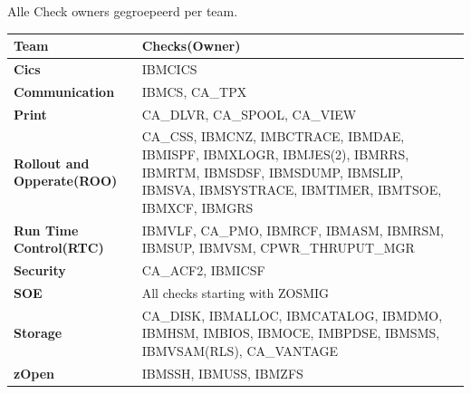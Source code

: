 Alle Check owners gegroepeerd per team.

\begin{table}[h]
	\begin{tabular}{|l|p{9cm}|}
		\hline
		\textbf{Team}                      & \textbf{Checks(Owner)}                                                                                                                                                 \\ \hline
		\textbf{Cics}                      & IBMCICS                                                                                                                                                                \\ \hline
		\textbf{Communication}             & IBMCS, CA\_TPX                                                                                                                                                         \\ \hline
		\textbf{Print}                     & CA\_DLVR, CA\_SPOOL, CA\_VIEW                                                                                                                                          \\ \hline
		\textbf{Rollout and Opperate(ROO)} & CA\_CSS, IBMCNZ,  IMBCTRACE, IBMDAE, IBMISPF, IBMXLOGR, IBMJES(2), IBMRRS, IBMRTM, IBMSDSF, IBMSDUMP, IBMSLIP, IBMSVA, IBMSYSTRACE, IBMTIMER, IBMTSOE,  IBMXCF, IBMGRS \\ \hline
		\textbf{Run Time Control(RTC)}     & IBMVLF, CA\_PMO, IBMRCF, IBMASM, IBMRSM, IBMSUP, IBMVSM,  CPWR\_THRUPUT\_MGR                                                                                           \\ \hline
		\textbf{Security}                  & CA\_ACF2, IBMICSF                                                                                                                                                      \\ \hline
		\textbf{SOE}                       & All checks starting with ZOSMIG                                                                                                                                        \\ \hline
		\textbf{Storage}                   & CA\_DISK, IBMALLOC, IBMCATALOG, IBMDMO, IBMHSM, IMBIOS, IBMOCE, IMBPDSE, IBMSMS, IBMVSAM(RLS), CA\_VANTAGE                                                             \\ \hline
		\textbf{zOpen}                     & IBMSSH, IBMUSS, IBMZFS                                                                                                                                                 \\ \hline

\end{tabular}
\end{table}
